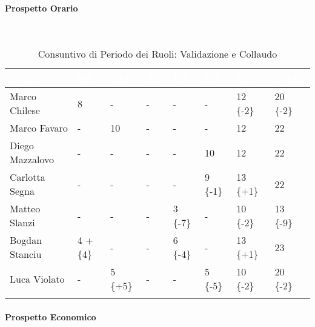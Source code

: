\paragraph{Prospetto Orario } ~\\
\begin{longtable}{|C{.30\textwidth}|C{.06\textwidth}|C{.06\textwidth}|C{.06\textwidth} | C{.06\textwidth}| C{.06\textwidth} | C{.06\textwidth} | C{.10\textwidth} |}
	\hline
		\textbf{\textcolor{white}{Nome}} & \textbf{\textcolor{white}{RE}} & \textbf{\textcolor{white}{AM}} & \textbf{\textcolor{white}{AN}} & \textbf{\textcolor{white}{PJ}} & \textbf{\textcolor{white}{PR}} & \textbf{\textcolor{white}{VE}} & \textbf{\textcolor{white}{Totale}}\\
	\hline 
	Marco Chilese & 8 & - & - & - & - & 12 \{-2\}& 20 \{-2\} \\
	\hline
	Marco Favaro &  - & 10 & - & - & - & 12 & 22 \\
	\hline
	Diego Mazzalovo & - & -  & - & - & 10 & 12 & 22 \\
	\hline
	Carlotta Segna & - & -  & - & - & 9 \{-1\} & 13 \{+1\} & 22 \\
	\hline
	Matteo Slanzi & - & - & - & 3 \{-7\}  & - & 10 \{-2\} & 13 \{-9\}\\
	\hline
	Bogdan Stanciu & 4 +\{4\} & - & - & 6 \{-4\} &  - & 13 \{+1\} & 23 \\
	\hline
	Luca Violato & - & 5 \{+5\} & - & - & 5 \{-5\} & 10 \{-2\}  & 20 \{-2\}\\   
	\hline
	
	
	\caption{Consuntivo di Periodo dei Ruoli: Validazione e Collaudo}
	\label{CP PRC}
\end{longtable}

\paragraph{Prospetto Economico} ~\\

